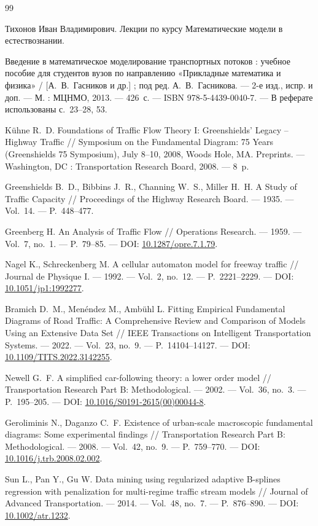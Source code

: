 \documentclass[12pt,a4paper]{article}
\begin{document}
\begin{thebibliography}{99}

Тихонов Иван Владимирович. Лекции по курсу Математические модели в естествознании.

Введение в математическое моделирование транспортных потоков :
учебное пособие для студентов вузов по направлению
«Прикладные математика и физика» /
[А.~В.~Гасников и др.] ; под ред. А.~В.~Гасникова. --- 2-е изд., испр. и доп. ---
М. : МЦНМО, 2013. --- 426~с. --- ISBN 978-5-4439-0040-7. ---
В реферате использованы с.~23--28, 53.

K\"uhne R.~D.
Foundations of Traffic Flow Theory I: Greenshields' Legacy -- Highway Traffic //
Symposium on the Fundamental Diagram: 75 Years
(Greenshields 75 Symposium), July 8--10, 2008, Woods Hole, MA. Preprints. ---
Washington, DC : Transportation Research Board, 2008. --- 8~p.

Greenshields B.~D., Bibbins J.~R., Channing W.~S., Miller H.~H.
A Study of Traffic Capacity //
Proceedings of the Highway Research Board. --- 1935. --- Vol.~14. --- P.~448--477.

Greenberg H.
An Analysis of Traffic Flow //
Operations Research. --- 1959. --- Vol.~7, no.~1. --- P.~79--85. ---
DOI: \href{https://doi.org/10.1287/opre.7.1.79}{10.1287/opre.7.1.79}.

Nagel K., Schreckenberg M.
A cellular automaton model for freeway traffic //
Journal de Physique I. --- 1992. --- Vol.~2, no.~12. --- P.~2221--2229. ---
DOI: \href{https://doi.org/10.1051/jp1:1992277}{10.1051/jp1:1992277}.

Bramich D.~M., Men\'endez M., Amb\"uhl L.
Fitting Empirical Fundamental Diagrams of Road Traffic:
A Comprehensive Review and Comparison of Models Using an Extensive Data Set //
IEEE Transactions on Intelligent Transportation Systems. --- 2022. --- Vol.~23, no.~9. ---
P.~14104--14127. ---
DOI: \href{https://doi.org/10.1109/TITS.2022.3142255}{10.1109/TITS.2022.3142255}.

Newell G.~F.
A simplified car-following theory: a lower order model //
Transportation Research Part B: Methodological. --- 2002. --- Vol.~36, no.~3. ---
P.~195--205. ---
DOI: \href{https://doi.org/10.1016/S0191-2615(00)00044-8}{10.1016/S0191-2615(00)00044-8}.

Geroliminis N., Daganzo C.~F.
Existence of urban-scale macroscopic fundamental diagrams:
Some experimental findings //
Transportation Research Part B: Methodological. --- 2008. --- Vol.~42, no.~9. ---
P.~759--770. ---
DOI: \href{https://doi.org/10.1016/j.trb.2008.02.002}{10.1016/j.trb.2008.02.002}.

Sun L., Pan Y., Gu W.
Data mining using regularized adaptive B-splines regression with penalization
for multi-regime traffic stream models //
Journal of Advanced Transportation. --- 2014. --- Vol.~48, no.~7. ---
P.~876--890. ---
DOI: \href{https://doi.org/10.1002/atr.1232}{10.1002/atr.1232}.

\end{thebibliography}
\end{document}
